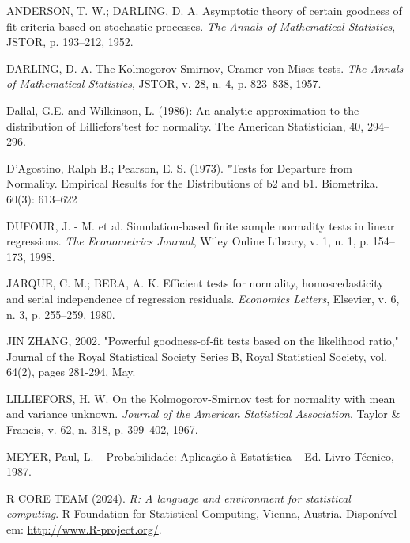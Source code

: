\documentclass[a4paper,11pt]{article} %
\begin{document}
\begin{flushleft}

\noindent ANDERSON, T. W.; DARLING, D. A. Asymptotic theory of certain goodness of fit criteria based on stochastic processes. {\it The Annals of Mathematical Statistics}, JSTOR, p. 193–212, 1952.\newline
    
\noindent DARLING, D. A. The Kolmogorov-Smirnov, Cramer-von Mises tests. {\it The Annals of Mathematical Statistics}, JSTOR, v. 28, n. 4, p. 823–838, 1957.\newline


\noindent Dallal, G.E. and Wilkinson, L. (1986): An analytic approximation to the distribution of Lilliefors’test for normality. The American Statistician, 40, 294–296.\newline


\noindent D'Agostino, Ralph B.; Pearson, E. S. (1973). "Tests for Departure from Normality. Empirical Results for the Distributions of b2 and b1. Biometrika. 60(3): 613–622
\newline
    
\noindent DUFOUR, J. - M. et al. Simulation-based finite sample normality tests in linear regressions. {\it The Econometrics Journal}, Wiley Online Library, v. 1, n. 1, p. 154–173, 1998.\newline
    
\noindent JARQUE, C. M.; BERA, A. K. Efficient tests for normality, homoscedasticity and serial independence of regression residuals. {\it Economics Letters}, Elsevier, v. 6, n. 3, p. 255–259, 1980.\newline

\noindent JIN ZHANG, 2002. "Powerful goodness‐of‐fit tests based on the likelihood ratio," Journal of the Royal Statistical Society Series B, Royal Statistical Society, vol. 64(2), pages 281-294, May.\newline

\noindent LILLIEFORS, H. W. On the Kolmogorov-Smirnov test for normality with mean and variance unknown. {\it Journal of the American Statistical Association}, Taylor \& Francis, v. 62, n. 318, p. 399–402, 1967.\newline

\noindent MEYER, Paul, L. – Probabilidade: Aplicação à Estatística – Ed. Livro Técnico, 1987. \newline
    
\noindent R CORE TEAM (2024). {\it R: A language and environment for statistical computing}. R Foundation for Statistical Computing, Vienna, Austria. Disponível em: \url{http://www.R-project.org/}.\newline


\end{flushleft}
\end{document}
